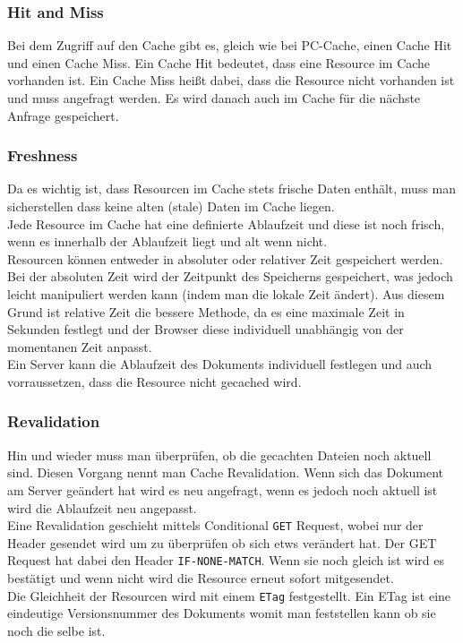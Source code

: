 \documentclass{article}
\begin{document}
	\subsubsection{Hit and Miss}
	Bei dem Zugriff auf den Cache gibt es, gleich wie bei PC-Cache, einen Cache Hit und einen Cache Miss. Ein Cache Hit bedeutet, dass eine Resource im Cache vorhanden ist. Ein Cache Miss heißt dabei, dass die Resource nicht vorhanden ist und muss angefragt werden. Es wird danach auch im Cache für die nächste Anfrage gespeichert.
	\subsubsection{Freshness}
	Da es wichtig ist, dass Resourcen im Cache stets frische Daten enthält, muss man sicherstellen dass keine alten (stale) Daten im Cache liegen. \\
	Jede Resource im Cache hat eine definierte Ablaufzeit und diese ist noch frisch, wenn es innerhalb der Ablaufzeit liegt und alt wenn nicht. \\
	Resourcen können entweder in absoluter oder relativer Zeit gespeichert werden. Bei der absoluten Zeit wird der Zeitpunkt des Speicherns gespeichert, was jedoch leicht manipuliert werden kann (indem man die lokale Zeit ändert). Aus diesem Grund ist relative Zeit die bessere Methode, da es eine maximale Zeit in Sekunden festlegt und der Browser diese individuell unabhängig von der momentanen Zeit anpasst. \\
	Ein Server kann die Ablaufzeit des Dokuments individuell festlegen und auch vorraussetzen, dass die Resource nicht gecached wird.
	\subsubsection{Revalidation}
	Hin und wieder muss man überprüfen, ob die gecachten Dateien noch aktuell sind. Diesen Vorgang nennt man Cache Revalidation. Wenn sich das Dokument am Server geändert hat wird es neu angefragt, wenn es jedoch noch aktuell ist wird die Ablaufzeit neu angepasst. \\
	Eine Revalidation geschieht mittels Conditional \texttt{GET} Request, wobei nur der Header gesendet wird um zu überprüfen ob sich etws verändert hat. Der GET Request hat dabei den Header \texttt{IF-NONE-MATCH}. Wenn sie noch gleich ist wird es bestätigt und wenn nicht wird die Resource erneut sofort mitgesendet. \\
	Die Gleichheit der Resourcen wird mit einem \texttt{ETag} festgestellt. Ein ETag ist eine eindeutige Versionsnummer des Dokuments womit man feststellen kann ob sie noch die selbe ist.
\end{document}
